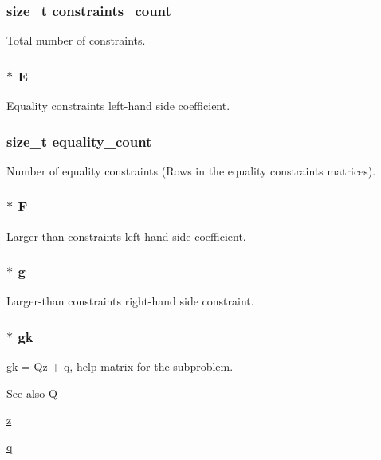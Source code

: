 \subsubsection[{constraints\+\_\+count}]{\setlength{\rightskip}{0pt plus 5cm}size\+\_\+t constraints\+\_\+count}\label{structproblem_a012d5476bfafdc0daca39a8f4ae8d2c6}
Total number of constraints. \hypertarget{structproblem_a1fc7c4b0ad7cae12ae26a243648cec36}{}
\subsubsection[{E}]{$\ast$ E}\label{structproblem_a1fc7c4b0ad7cae12ae26a243648cec36}
Equality constraints left-\/hand side coefficient. \hypertarget{structproblem_ab1f41a0e1cbb52fb94997615f262fe20}{}
\subsubsection[{equality\+\_\+count}]{\setlength{\rightskip}{0pt plus 5cm}size\+\_\+t equality\+\_\+count}\label{structproblem_ab1f41a0e1cbb52fb94997615f262fe20}
Number of equality constraints (Rows in the equality constraints matrices). \hypertarget{structproblem_a9cba4c914ccb68d2fa56a599049b5d88}{}
\subsubsection[{F}]{$\ast$ F}\label{structproblem_a9cba4c914ccb68d2fa56a599049b5d88}
Larger-\/than constraints left-\/hand side coefficient. \hypertarget{structproblem_ab6856d3e27905889927bce25e9c93d37}{}
\subsubsection[{g}]{$\ast$ g}\label{structproblem_ab6856d3e27905889927bce25e9c93d37}
Larger-\/than constraints right-\/hand side constraint. \hypertarget{structproblem_abfbecabeb3ffaa60557898d366c79c35}{}
\subsubsection[{gk}]{$\ast$ gk}\label{structproblem_abfbecabeb3ffaa60557898d366c79c35}
gk = Qz + q, help matrix for the subproblem. \begin{DoxySeeAlso}{See also}
\hyperlink{structproblem_ae50fecd2794ca5844d6d01efcf17294c}{Q} 

\hyperlink{structproblem_a840058b5c67561185c94da497d0d3da6}{z} 

\hyperlink{structproblem_a7755407fcbd4345b31d64bbc181af35a}{q} 
\end{DoxySeeAlso}
\hypertarget{structproblem_a8e142e0ead965e30c731cac0c81f0546}{}
